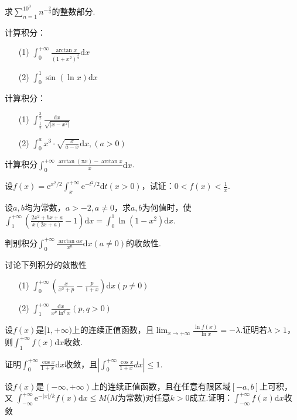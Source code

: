 \begin{xiti}
\item 求$\sum_{n=1}^{10^{9}} n^{-\frac{2}{3}}$的整数部分.
\item 计算积分：
\begin{enumerate}
	\item [(1)]$\int_{0}^{+\infty} \frac{\arctan x}{\left(1+x^{2}\right)^{\frac{3}{2}}} \mathrm{d} x$
	\item [(2)]$\int_{0}^{1} \sin (\ln x) \mathrm{d} x$
\end{enumerate}
\item 计算积分：
\begin{enumerate}
	\item [(1)]$\int_{\frac{1}{2}}^{\frac{3}{2}} \frac{\mathrm{d} x}{\sqrt{\left|x-x^{2}\right|}}$
	\item [(2)]$\int_{0}^{a} x^{3} \cdot \sqrt{\frac{x}{a-x}} \mathrm{d} x,(a>0)$
\end{enumerate}
\item 计算积分$\int_{0}^{+\infty} \frac{\arctan (\pi x)-\arctan x}{x} \mathrm{d} x$.
\item 设$f(x)=\mathrm{e}^{x^{2} / 2} \int_{x}^{+\infty} \mathrm{e}^{-t^{2} / 2} \mathrm{d} t(x>0)$，试证：$0<f(x)<\frac{1}{x}$.
\item 设$a,b$均为常数，$a>-2,a\ne 0$，求$a,b$为何值时，使$\int_{1}^{+\infty}\left(\frac{2 x^{2}+b x+a}{x(2 x+a)}-1\right) \mathrm{d} x=\int_{0}^{1} \ln \left(1-x^{2}\right) \mathrm{d} x$.
\item 判别积分$\int_{0}^{+\infty} \frac{\arctan a x}{x^{n}} \mathrm{d} x(a \neq 0)$的收敛性.
\item 讨论下列积分的敛散性
\begin{enumerate}
	\item [(1)]$\int_{0}^{+\infty}\left(\frac{x}{x^{2}+p}-\frac{p}{1+x}\right) \mathrm{d} x(p \neq 0)$
	\item [(2)]$\int_{1}^{+\infty} \frac{\mathrm{d} x}{x^{p} \ln ^{q} x}(p, q>0)$
\end{enumerate}
\item 设$f(x)$是$[1,+\infty)$上的连续正值函数，且$\lim _{x \rightarrow+\infty} \frac{\ln f(x)}{\ln x}=-\lambda$.证明若$\lambda>1$，则$\int_{1}^{+\infty} f(x) \mathrm{d} x$收敛.
\item 证明$\int_{0}^{+\infty} \frac{\cos x}{1+x}  \mathrm{d} x$收敛，且$\left|\int_{0}^{+\infty} \frac{\cos x}{1+x} d x\right| \leqslant 1$.
\item 设$f(x)$是$(-\infty,+\infty)$上的连续正值函数，且在任意有限区域$[-a,b]$上可积，又
$\int_{-\infty}^{+\infty} \mathrm{e}^{-|x| / k} f(x) \mathrm{d} x \leqslant M$($M$为常数)对任意$k>0$成立.证明：$\int_{-\infty}^{+\infty} f(x) \mathrm{d} x$收敛


\end{xiti}

